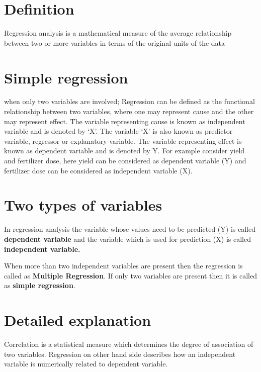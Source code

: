 \documentclass[
]{book}
\begin{document}
\hypertarget{definition}{%
\section{Definition}\label{definition}}

Regression analysis is a mathematical measure of the
average relationship between two or more variables in terms of the
original units of the data

\hypertarget{simple-regression}{%
\section{Simple regression}\label{simple-regression}}

when only two variables are involved; Regression
can be defined as the functional relationship between two variables,
where one may represent cause and the other may represent effect. The
variable representing cause is known as independent variable and is
denoted by `X'. The variable `X' is also known as predictor variable,
regressor or explanatory variable. The variable representing effect is
known as dependent variable and is denoted by Y. For example consider
yield and fertilizer dose, here yield can be considered as dependent
variable (Y) and fertilizer dose can be considered as independent
variable (X).

\hypertarget{two-types-of-variables}{%
\section{Two types of variables}\label{two-types-of-variables}}

In regression analysis the
variable whose values need to be predicted (Y) is called \textbf{dependent variable} and the variable which is used for prediction (X) is called
\textbf{independent variable.}

When more than two independent variables are present then the regression
is called as \textbf{Multiple Regression}. If only two variables are present
then it is called as \textbf{simple regression}.

\hypertarget{detailed-explanation}{%
\section{Detailed explanation}\label{detailed-explanation}}

Correlation is a statistical measure which determines the degree of
association of two variables. Regression on other hand side describes
how an independent variable is numerically related to dependent
variable.
\end{document}
